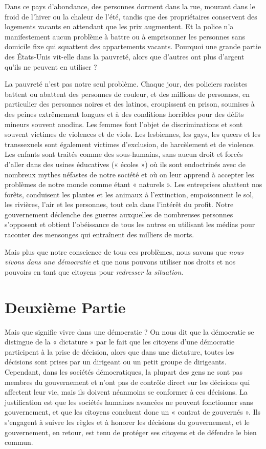 Dans ce pays d'abondance, des personnes dorment dans la rue, mourant dans le froid de l'hiver ou la chaleur de l'été, tandis que des propriétaires conservent des logements vacants en attendant que les prix augmentent. Et la police n'a manifestement aucun problème à battre ou à emprisonner les personnes sans domicile fixe qui squattent des appartements vacants. Pourquoi une grande partie des États-Unis vit-elle dans la pauvreté, alors que d'autres ont plus d'argent qu'ils ne peuvent en utiliser ?

La pauvreté n'est pas notre seul problème. Chaque jour, des policiers racistes battent ou abattent des personnes de couleur, et des millions de personnes, en particulier des personnes noires et des latinos, croupissent en prison, soumises à des peines extrêmement longues et à des conditions horribles pour des délits mineurs souvent anodins. Les femmes font l'objet de discriminations et sont souvent victimes de violences et de viols. Les lesbiennes, les gays, les queers et les transsexuels sont également victimes d'exclusion, de harcèlement et de violence. Les enfants sont traités comme des sous-humains, sans aucun droit et forcés d'aller dans des usines éducatives (« écoles ») où ils sont endoctrinés avec de nombreux mythes néfastes de notre société et où on leur apprend à accepter les problèmes de notre monde comme étant « naturels ». Les entreprises abattent nos forêts, conduisent les plantes et les animaux à l'extinction, empoisonnent le sol, les rivières, l'air et les personnes, tout cela dans l'intérêt du profit. Notre gouvernement déclenche des guerres auxquelles de nombreuses personnes s'opposent et obtient l'obéissance de tous les autres en utilisant les médias pour raconter des mensonges qui entraînent des milliers de morts.

Mais plus que notre conscience de tous ces problèmes, nous savons que \emph{nous vivons dans une démocratie} et que nous pouvons utiliser nos droits et nos pouvoirs en tant que citoyens pour \emph{redresser la situation}.

\chapter*{\textbf{Deuxième Partie}}\hypertarget{deuxime-partie}{}\label{deuxime-partie}

Mais que signifie vivre dans une démocratie ? On nous dit que la démocratie se distingue de la « dictature » par le fait que les citoyens d'une démocratie participent à la prise de décision, alors que dans une dictature, toutes les décisions sont prises par un dirigeant ou un petit groupe de dirigeants. Cependant, dans les sociétés démocratiques, la plupart des gens ne sont pas membres du gouvernement et n'ont pas de contrôle direct sur les décisions qui affectent leur vie, mais ils doivent néanmoins se conformer à ces décisions. La justification est que les sociétés humaines avancées ne peuvent fonctionner sans gouvernement, et que les citoyens concluent donc un « contrat de gouvernés ». Ils s'engagent à suivre les règles et à honorer les décisions du gouvernement, et le gouvernement, en retour, est tenu de protéger ses citoyens et de défendre le bien commun.

